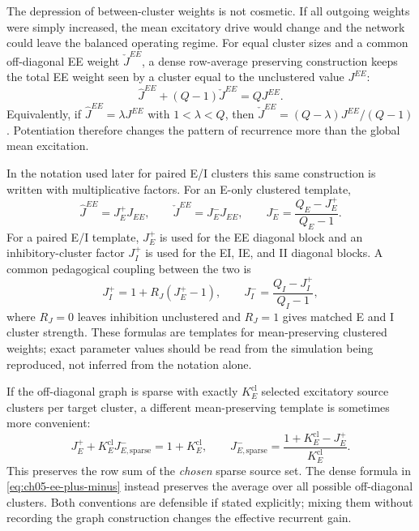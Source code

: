 The depression of between-cluster weights is not cosmetic. If all outgoing
weights were simply increased, the mean excitatory drive would change and the
network could leave the balanced operating regime. For equal cluster sizes and
a common off-diagonal EE weight $\check J^{EE}$, a dense row-average preserving
construction keeps the total EE weight seen by a cluster equal to the
unclustered value $J^{EE}$:
%
\begin{equation}
  \hat J^{EE}+(Q-1)\check J^{EE}=QJ^{EE}.
  \label{eq:ch05-mean-preserving-ee-clustering}
\end{equation}
%
Equivalently, if $\hat J^{EE}=\lambda J^{EE}$ with $1<\lambda<Q$, then
$\check J^{EE}=(Q-\lambda)J^{EE}/(Q-1)$. Potentiation therefore changes the
pattern of recurrence more than the global mean excitation.

In the notation used later for paired E/I clusters this same construction is
written with multiplicative factors. For an E-only clustered template,
%
\begin{equation}
  \hat J^{EE}=J_E^+J_{EE},
  \qquad
  \check J^{EE}=J_E^-J_{EE},
  \qquad
  J_E^-=\frac{Q_E-J_E^+}{Q_E-1}.
  \label{eq:ch05-ee-plus-minus}
\end{equation}
%
For a paired E/I template, $J_E^+$ is used for the EE diagonal block and an
inhibitory-cluster factor $J_I^+$ is used for the EI, IE, and II diagonal
blocks. A common pedagogical coupling between the two is
%
\begin{equation}
  J_I^+=1+R_J(J_E^+-1),
  \qquad
  J_I^-=\frac{Q_I-J_I^+}{Q_I-1},
  \label{eq:ch05-inhibitory-plus-minus}
\end{equation}
%
where $R_J=0$ leaves inhibition unclustered and $R_J=1$ gives matched E and I
cluster strength. These formulas are templates for mean-preserving clustered
weights; exact parameter values should be read from the simulation being
reproduced, not inferred from the notation alone.

If the off-diagonal graph is sparse with exactly $K_E^{\mathrm{cl}}$ selected
excitatory source clusters per target cluster, a different mean-preserving
template is sometimes more convenient:
%
\begin{equation}
  J_E^+ + K_E^{\mathrm{cl}}J_{E,\mathrm{sparse}}^- = 1+K_E^{\mathrm{cl}},
  \qquad
  J_{E,\mathrm{sparse}}^-=
  \frac{1+K_E^{\mathrm{cl}}-J_E^+}{K_E^{\mathrm{cl}}}.
  \label{eq:ch05-sparse-ee-depression}
\end{equation}
%
This preserves the row sum of the \emph{chosen} sparse source set. The dense
formula in \cref{eq:ch05-ee-plus-minus} instead preserves the average over all
possible off-diagonal clusters. Both conventions are defensible if stated
explicitly; mixing them without recording the graph construction changes the
effective recurrent gain.

